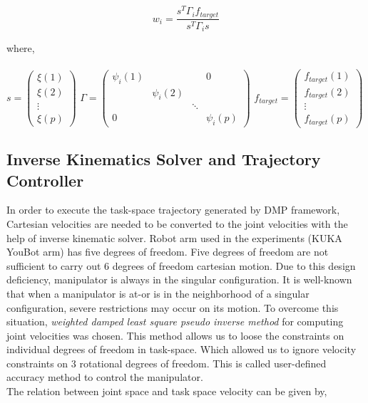 \begin{equation}
	w_{i} = \frac{s^{T}\Gamma_{i}f_{target}}{s^{T}\Gamma_{i}s}
\end{equation}

where,\\
\\
\vspace{1cm}
$
s = 
\begin{pmatrix}
\xi(1) \\
\xi(2) \\
\vdots  \\
\xi(p) 
\end{pmatrix}
$
$
\Gamma = 
\begin{pmatrix}
	\psi_{i}(1) &   &  & 0 \\
	 &\psi_{i}(2)&  &  \\
	 &  & \ddots &   \\
	0 &  &  & \psi_{i}(p)
\end{pmatrix}
$
$
f_{target} = 
\begin{pmatrix}
f_{target}(1) \\
f_{target}(2) \\
\vdots  \\
f_{target}(p) 
\end{pmatrix}
$

\subsection{Inverse Kinematics Solver and Trajectory Controller}

In order to execute the task-space trajectory generated by DMP framework, Cartesian velocities are needed to be converted to the joint velocities with the help of inverse kinematic solver. Robot arm used in the experiments (KUKA YouBot arm) has five degrees of freedom. Five degrees of freedom are not sufficient to carry out 6 degrees of freedom cartesian motion. Due to this design deficiency, manipulator is always in the singular configuration. It is well-known that when a manipulator is at-or is in the neighborhood of a singular configuration, severe restrictions may occur on its motion. To overcome this situation, \textit{weighted damped least square pseudo inverse method} for computing joint velocities was chosen. This method allows us to loose the constraints on individual degrees of freedom in task-space. Which allowed us to ignore velocity constraints on 3 rotational degrees of freedom. This is called user-defined accuracy method to control the manipulator. \cite{chiaverini1994review}
\\
The relation between joint space and task space velocity can be given by, 

